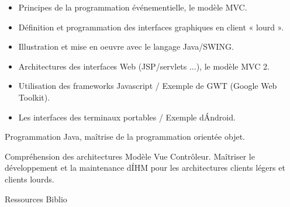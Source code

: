 \vfill

{
\begin{itemize} 
\item Principes de la programmation événementielle, le modèle MVC.
\item Définition et programmation des interfaces graphiques en client « lourd ».
\item Illustration et mise en oeuvre avec le langage Java/SWING.
\item Architectures des interfaces Web (JSP/servlets ...), le modèle MVC 2.
\item Utilisation des frameworks Javascript / Exemple de GWT (Google Web Toolkit).
\item Les interfaces des terminaux portables / Exemple d\'Android.
\end{itemize} 
} 
{Programmation Java, maîtrise de la programmation orientée objet.} 
{\begin{itemize} 
  \ObjItem Compréhension des architectures Modèle Vue Contrôleur.
  \ObjItem Maîtriser le développement et la maintenance d\'IHM pour les architectures clients légers et clients lourds.
\end{itemize} 
} 
{Ressources} 
{Biblio} 
 
\vfill

